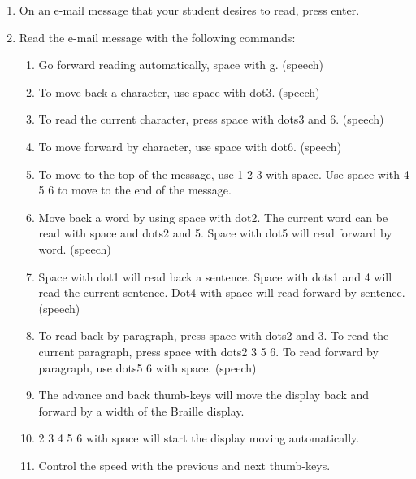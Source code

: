 \documentclass[10pt,letterpaper,twoside]{report}
\begin{document}
{{{{\begin{enumerate}
	\item On an e-mail message that your student desires to read, press enter.
	      
	\item Read the e-mail message with the following commands:
	      
	      \begin{enumerate}
		      \item Go forward reading automatically, space with g.  (speech)
		            
		      \item To move back a character, use space with dot3. (speech)
		            
		      \item To read the current character, press space with dots3 and 6.  (speech)
		            
		      \item To move forward by character, use space with dot6. (speech)
		            
		      \item To move to the top of the message, use 1 2 3 with space.  Use space with 4 5 6 to move to the end of the message.
		            
		      \item Move back a word by using space with dot2. The current word can be read with space and dots2 and 5.   Space with dot5 will read forward by word.  (speech)
		            
		      \item Space with dot1 will read back a sentence.  Space with dots1 and 4 will read the current sentence.  Dot4 with space will read forward by sentence.  (speech)
		            
		      \item To read back by paragraph, press space with dots2 and 3.  To read the current paragraph, press space with dots2 3 5 6.  To read forward by paragraph, use dots5 6 with space.  (speech)
		            
		      \item The advance and back thumb-keys will move the display back and forward by a width of the Braille display.
		            
		      \item 2 3 4 5 6 with space will start the display moving automatically.
		            
		      \item Control the speed with the previous and next thumb-keys.
		            

\end{enumerate}
\end{enumerate}}}}}
\end{document}
